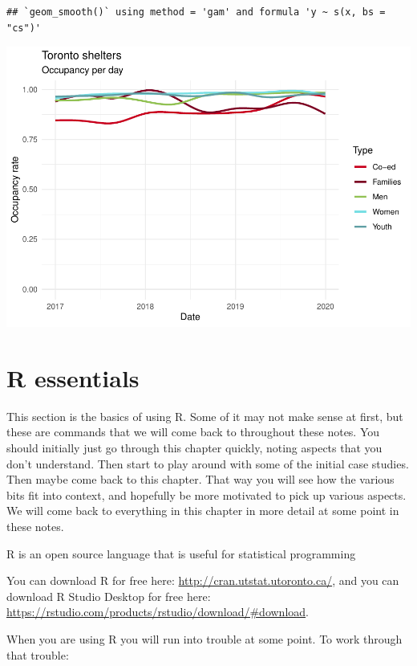 \documentclass[
]{book}
\begin{document}
\begin{verbatim}
## `geom_smooth()` using method = 'gam' and formula 'y ~ s(x, bs = "cs")'
\end{verbatim}

\includegraphics{telling_stories_with_data_files/figure-latex/unnamed-chunk-15-1.pdf}

\hypertarget{r-essentials}{%
\section{R essentials}\label{r-essentials}}

This section is the basics of using R. Some of it may not make sense at first, but these are commands that we will come back to throughout these notes. You should initially just go through this chapter quickly, noting aspects that you don't understand. Then start to play around with some of the initial case studies. Then maybe come back to this chapter. That way you will see how the various bits fit into context, and hopefully be more motivated to pick up various aspects. We will come back to everything in this chapter in more detail at some point in these notes.

R is an open source language that is useful for statistical programming

You can download R for free here: \url{http://cran.utstat.utoronto.ca/}, and you can download R Studio Desktop for free here: \url{https://rstudio.com/products/rstudio/download/\#download}.

When you are using R you will run into trouble at some point. To work through that trouble:
\end{document}
